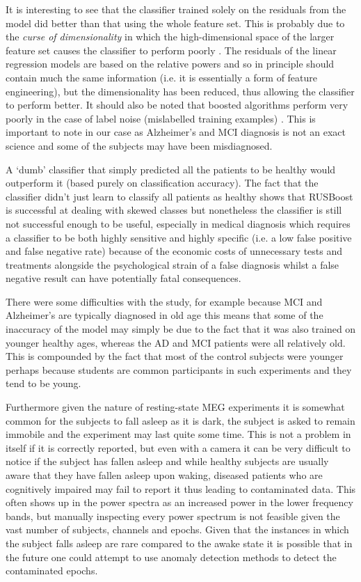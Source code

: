 It is interesting to see that the classifier trained solely on the residuals from the model did better than that using the whole feature set. This is probably due to the \textit{curse of dimensionality} in which the high-dimensional space of the larger feature set causes the classifier to perform poorly \cite{Witten2011}. The residuals of the linear regression models are based on the relative powers and so in principle should contain much the same information (i.e. it is essentially a form of feature engineering), but the dimensionality has been reduced, thus allowing the classifier to perform better. It should also be noted that boosted algorithms perform very poorly in the case of label noise (mislabelled training examples) \cite{Long2009}. This is important to note in our case as Alzheimer's and MCI diagnosis is not an exact science and some of the subjects may have been misdiagnosed.

A `dumb' classifier that simply predicted all the patients to be healthy would outperform it (based purely on classification accuracy). The fact that the classifier didn't just learn to classify all patients as healthy shows that RUSBoost is successful at dealing with skewed classes but nonetheless the classifier is still not successful enough to be useful, especially in medical diagnosis which requires a classifier to be both highly sensitive and highly specific (i.e. a low false positive and false negative rate) because of the economic costs of unnecessary tests and treatments alongside the psychological strain of a false diagnosis whilst a false negative result can have potentially fatal consequences.

There were some difficulties with the study, for example because MCI and Alzheimer's are typically diagnosed in old age this means that some of the inaccuracy of the model may simply be due to the fact that it was also trained on younger healthy ages, whereas the AD and MCI patients were all relatively old. This is compounded by the fact that most of the control subjects were younger perhaps because students are common participants in such experiments and they tend to be young.

Furthermore given the nature of resting-state MEG experiments it is somewhat common for the subjects to fall asleep as it is dark, the subject is asked to remain immobile and the experiment may last quite some time. This is not a problem in itself if it is correctly reported, but even with a camera it can be very difficult to notice if the subject has fallen asleep and while healthy subjects are usually aware that they have fallen asleep upon waking, diseased patients who are cognitively impaired may fail to report it thus leading to contaminated data. This often shows up in the power spectra as an increased power in the lower frequency bands, but manually inspecting every power spectrum is not feasible given the vast number of subjects, channels and epochs. Given that the instances in which the subject falls asleep are rare compared to the awake state it is possible that in the future one could attempt to use anomaly detection methods\cite{Chandola2009} to detect the contaminated epochs.

